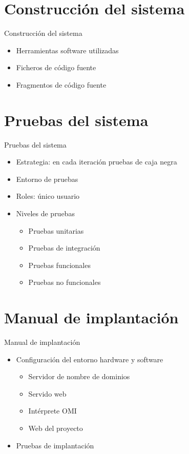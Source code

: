 \documentclass[spanish]{beamer}
\begin{document}
\section{Construcción del sistema}
\begin{frame}{Construcción del sistema}
   \begin{itemize}
         \item Herramientas software utilizadas
         \item Ficheros de código fuente
         \item Fragmentos de código fuente
   \end{itemize}
\end{frame}

\section{Pruebas del sistema}
\begin{frame}{Pruebas del sistema}
   \begin{itemize}
         \item Estrategia: en cada iteración pruebas de caja negra 
         \item Entorno de pruebas
         \item Roles: único usuario
         \item Niveles de pruebas
         \begin{itemize}
            \item Pruebas unitarias
            \item Pruebas de integración
            \item Pruebas funcionales
            \item Pruebas no funcionales
         \end{itemize}
   \end{itemize}
\end{frame}

\section{Manual de implantación}
\begin{frame}{Manual de implantación}
   \begin{itemize}
         \item Configuración del entorno hardware y software
         \begin {itemize}
            \item Servidor de nombre de dominios
            \item Servido web
            \item Intérprete OMI
            \item Web del proyecto
         \end{itemize}
         \item Pruebas de implantación
   \end{itemize}
\end{frame}
\end{document}
